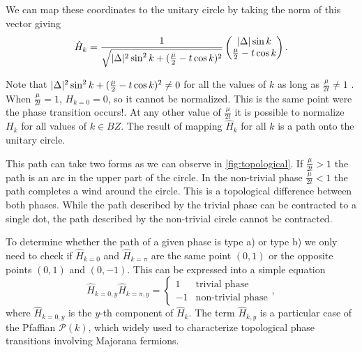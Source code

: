 We can map these coordinates to the unitary circle by taking the norm of this vector giving
\begin{equation}
     \hat{H}_k= \frac{1}{\sqrt{\vert \Delta \vert^2 \sin^2 k + (\frac{\mu}{2}- t \cos k)^2}}
     \begin{pmatrix} 
      \vert \Delta \vert \sin k    \\ 
      \frac{\mu}{2}- t \cos k 
    \end{pmatrix}. 
\end{equation}

\noindent Note that $\vert \Delta \vert^2 \sin^2 k + (\frac{\mu}{2}- t \cos k)^2 \neq 0$ for all the values of $k$ as long as $\frac{\mu}{2t} \neq 1$ . When $\frac{\mu}{2t} = 1$, $H_{k=0}=0$, so it cannot be normalized. This is the same point were the phase transition occurs!. At any other value of $\frac{\mu}{2t}$ it is possible to normalize $H_{k}$ for all values of $k\in BZ$. The result of mapping $\hat{H}_k$ for all $k$ is a path onto the unitary circle. 

This path can take two forms as we can observe in \ref{fig:topological}. If $\frac{\mu}{2t} > 1$ the path is an arc in the upper part of the circle. In the non-trivial phase $\frac{\mu}{2t} < 1$ the path completes a wind around the circle. This is a topological difference between both phases. While the path described by the trivial phase can be contracted to a single dot, the path described by the non-trivial circle cannot be contracted. 

To determine whether the path of a given phase is type a) or type b) we only need to check if $\hat{H}_{k=0}$ and $\hat{H}_{k=\pi}$ are the same point $(0,1)$ or the opposite points $(0,1)$ and $(0,-1)$. This can be expressed into a simple equation 
\begin{equation}
    \hat{H}_{k=0,y}\hat{H}_{k=\pi,y}=\begin{cases}
1 & \mbox{trivial phase}\\
-1 & \mbox{non-trivial phase}
\end{cases},
\end{equation}
\noindent where $\hat{H}_{k=0,y}$ is the $y$-th component of $\hat{H}_{k}$. The term $\hat{H}_{k,y}$ is a particular case of the Pfaffian $\mathcal{P}(k)$, which widely used to characterize topological phase transitions involving  Majorana fermions.


